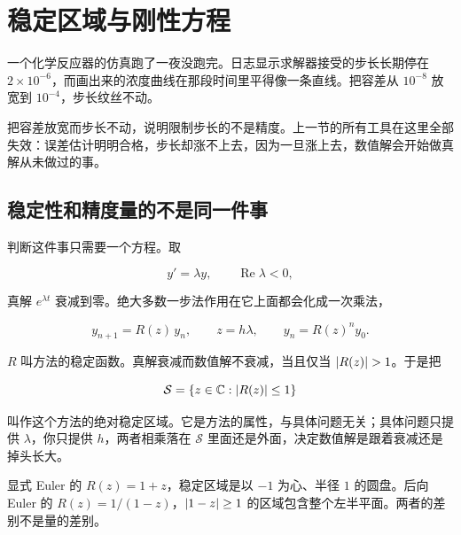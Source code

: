 \section{稳定区域与刚性方程}
\label{sec:08-Numerical-Analysis/06-ODE/03}

一个化学反应器的仿真跑了一夜没跑完。日志显示求解器接受的步长长期停在 \(2\times10^{-6}\)，而画出来的浓度曲线在那段时间里平得像一条直线。把容差从 \(10^{-8}\) 放宽到 \(10^{-4}\)，步长纹丝不动。

把容差放宽而步长不动，说明限制步长的不是精度。上一节的所有工具在这里全部失效：误差估计明明合格，步长却涨不上去，因为一旦涨上去，数值解会开始做真解从未做过的事。

\subsection{稳定性和精度量的不是同一件事}

判断这件事只需要一个方程。取

\[
y'=\lambda y,\qquad \operatorname{Re}\lambda<0,
\]

真解 \(e^{\lambda t}\) 衰减到零。绝大多数一步法作用在它上面都会化成一次乘法，

\[
y_{n+1}=R(z)\,y_n,\qquad z=h\lambda,\qquad y_n=R(z)^n y_0 .
\]

\(R\) 叫方法的稳定函数。真解衰减而数值解不衰减，当且仅当 \(\abs{R(z)}>1\)。于是把

\[
\mathcal S=\left\{z\in\mathbb{C}:\left|R(z)\right|\le1\right\}
\]

叫作这个方法的绝对稳定区域。它是方法的属性，与具体问题无关；具体问题只提供 \(\lambda\)，你只提供 \(h\)，两者相乘落在 \(\mathcal S\) 里面还是外面，决定数值解是跟着衰减还是掉头长大。

显式 Euler 的 \(R(z)=1+z\)，稳定区域是以 \(-1\) 为心、半径 \(1\) 的圆盘。后向 Euler 的 \(R(z)=1/(1-z)\)，\(\left|1-z\right|\ge1\) 的区域包含整个左半平面。两者的差别不是量的差别。

